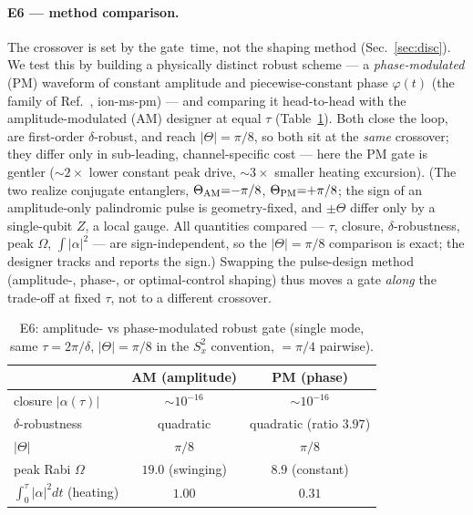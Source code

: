 \documentclass[aps,prapplied,twocolumn,superscriptaddress,floatfix,nofootinbib]{revtex4-2}
\begin{document}
\paragraph{E6 --- method comparison.} The crossover is set by the gate~time,
not the shaping method (Sec.~\ref{sec:disc}). We test this by building a physically distinct
robust scheme --- a \emph{phase-modulated} (PM) waveform of constant amplitude and
piecewise-constant phase $\varphi(t)$ (the family of Ref.~\cite{Milne20}, \textsf{ion-ms-pm})
--- and comparing it head-to-head with the amplitude-modulated (AM) designer at equal $\tau$
(Table~\ref{tab:e6}). Both close the loop, are first-order $\delta$-robust, and reach
$|\Theta|=\pi/8$, so both sit at the \emph{same} crossover; they differ only in sub-leading,
channel-specific cost --- here the PM gate is gentler ($\sim\!2\times$ lower constant peak
drive, $\sim\!3\times$ smaller heating excursion). (The two realize conjugate entanglers,
$\Theta_{\rm AM}{=}{-}\pi/8$, $\Theta_{\rm PM}{=}{+}\pi/8$; the sign of an amplitude-only
palindromic pulse is geometry-fixed, and $\pm\Theta$ differ only by a single-qubit $Z$, a local
gauge. All quantities compared --- $\tau$, closure, $\delta$-robustness, peak $\Omega$,
$\int|\alpha|^2$ --- are sign-independent, so the $|\Theta|=\pi/8$ comparison is exact; the
designer tracks and reports the sign.) Swapping the pulse-design method
(amplitude-, phase-, or optimal-control shaping) thus moves a gate \emph{along} the trade-off
at fixed $\tau$, not to a different crossover.

\begin{table}[t]\caption{E6: amplitude- vs phase-modulated robust gate (single mode, same
$\tau=2\pi/\delta$, $|\Theta|=\pi/8$ in the $S_x^2$ convention, $=\pi/4$ pairwise).}\label{tab:e6}
\begin{ruledtabular}\begin{tabular}{lcc}
 & AM (amplitude) & PM (phase) \\ \hline
closure $|\alpha(\tau)|$ & $\sim\!10^{-16}$ & $\sim\!10^{-16}$ \\
$\delta$-robustness & quadratic & quadratic (ratio $3.97$) \\
$|\Theta|$ & $\pi/8$ & $\pi/8$ \\
peak Rabi $\Omega$ & $19.0$ (swinging) & $8.9$ (constant) \\
$\int_0^\tau|\alpha|^2dt$ (heating) & $1.00$ & $0.31$ \\
\end{tabular}\end{ruledtabular}\end{table}
\end{document}
